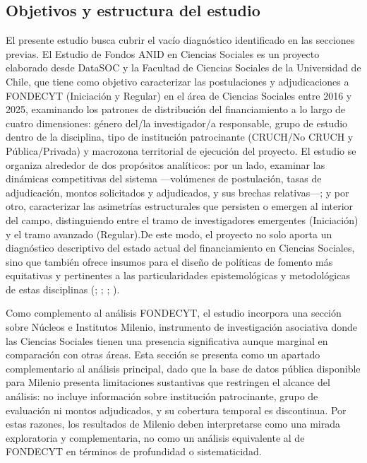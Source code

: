 \documentclass[
  12pt,
  letterpaper,
]{article}
\begin{document}
\subsection{Objetivos y estructura del
estudio}\label{objetivos-y-estructura-del-estudio}

El presente estudio busca cubrir el vacío diagnóstico identificado en
las secciones previas. El Estudio de Fondos ANID en Ciencias Sociales es
un proyecto elaborado desde DataSOC y la Facultad de Ciencias Sociales
de la Universidad de Chile, que tiene como objetivo caracterizar las
postulaciones y adjudicaciones a FONDECYT (Iniciación y Regular) en el
área de Ciencias Sociales entre 2016 y 2025, examinando los patrones de
distribución del financiamiento a lo largo de cuatro dimensiones: género
del/la investigador/a responsable, grupo de estudio dentro de la
disciplina, tipo de institución patrocinante (CRUCH/No CRUCH y
Pública/Privada) y macrozona territorial de ejecución del proyecto. El
estudio se organiza alrededor de dos propósitos analíticos: por un lado,
examinar las dinámicas competitivas del sistema ---volúmenes de
postulación, tasas de adjudicación, montos solicitados y adjudicados, y
sus brechas relativas---; y por otro, caracterizar las asimetrías
estructurales que persisten o emergen al interior del campo,
distinguiendo entre el tramo de investigadores emergentes (Iniciación) y
el tramo avanzado (Regular).De este modo, el proyecto no solo aporta un
diagnóstico descriptivo del estado actual del financiamiento en Ciencias
Sociales, sino que también ofrece insumos para el diseño de políticas de
fomento más equitativas y pertinentes a las particularidades
epistemológicas y metodológicas de estas disciplinas
(;
;
;
).

Como complemento al análisis FONDECYT, el estudio incorpora una sección
sobre Núcleos e Institutos Milenio, instrumento de investigación
asociativa donde las Ciencias Sociales tienen una presencia
significativa aunque marginal en comparación con otras áreas. Esta
sección se presenta como un apartado complementario al análisis
principal, dado que la base de datos pública disponible para Milenio
presenta limitaciones sustantivas que restringen el alcance del
análisis: no incluye información sobre institución patrocinante, grupo
de evaluación ni montos adjudicados, y su cobertura temporal es
discontinua. Por estas razones, los resultados de Milenio deben
interpretarse como una mirada exploratoria y complementaria, no como un
análisis equivalente al de FONDECYT en términos de profundidad o
sistematicidad.
\end{document}
